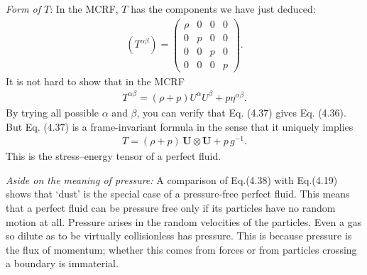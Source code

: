 \documentclass[11pt,letterpaper]{book}
\begin{document}
    \textit{Form of  \(T\)}: In the MCRF, \(T\) has the components we have just deduced:
    \begin{align}
    (T^{\alpha\beta}) =
    \begin{pmatrix}
    \rho & 0 & 0 & 0 \\
    0 & p & 0 & 0 \\
    0 & 0 & p & 0 \\
    0 & 0 & 0 & p
    \end{pmatrix}.
    \tag{4.36}
    \end{align}
    It is not hard to show that in the MCRF
    \begin{align}
    T^{\alpha\beta} = (\rho + p) U^\alpha U^\beta + p \eta^{\alpha\beta}. \tag{4.37}
    \end{align}
    By trying all possible \(\alpha\) and \(\beta\), you can verify that Eq. (4.37) gives Eq. (4.36). But Eq. (4.37) is a frame-invariant formula in the sense that it uniquely implies
    \begin{align}
    T = (\rho + p) \, \mathbf{U} \otimes \mathbf{U} + p \, g^{-1}. \tag{4.38}
    \end{align}
    This is the stress–energy tensor of a perfect fluid.

    \textit{Aside on the meaning of pressure:}
    A comparison of Eq.(4.38) with Eq.(4.19) shows that ‘dust’ is the special case of a pressure-free perfect fluid. This means that a perfect fluid can be pressure free only if its particles have no random motion at all. Pressure arises in the random velocities of the particles. Even a gas so dilute as to be virtually collisionless has pressure. This is because pressure is the flux of momentum; whether this comes from forces or from particles crossing a boundary is immaterial.
\end{document}
